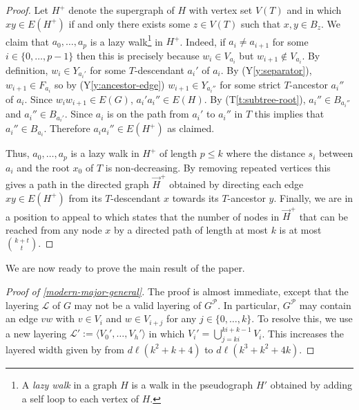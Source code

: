 \documentclass{patmorin}
\newcommand{\tref}[1]{(T\ref{t:#1})}
\newcommand{\yref}[1]{(Y\ref{y:#1})}
\renewcommand{\le}{\leqslant}
\begin{document}
\begin{proof}
  Let $H^+$ denote the supergraph of $H$ with vertex set $V(T)$ and in which $xy\in E(H^+)$ if and only there exists some $z\in V(T)$ such that $x,y\in B_z$. 
  We claim that $a_0,\ldots,a_p$ is a lazy walk\footnote{A \emph{lazy walk} in a graph $H$ is a walk in the pseudograph $H'$ obtained by adding a self loop to each vertex of $H$.} in $H^+$.  Indeed, if $a_i\neq a_{i+1}$ for some $i\in\{0,\ldots,p-1\}$ then this is precisely because $w_i\in V_{a_i}$ but $w_{i+1}\not\in V_{a_i}$.  By definition, $w_i\in Y_{a_i'}$ for some $T$-descendant $a_i'$ of $a_i$.
  By \yref{separator}, $w_{i+1}\in F_{a_i}$ so by \yref{ancestor-edge} $w_{i+1}\in Y_{a_i''}$ for some strict $T$-ancestor $a_i''$ of $a_i$.  Since $w_iw_{i+1}\in E(G)$, $a_i'a_i''\in E(H)$.  By \tref{subtree-root}, $a_i''\in B_{a_i''}$ and $a_i''\in B_{a_i'}$.  Since $a_i$ is on the path from $a_i'$ to $a_i''$ in $T$ this implies that $a_i''\in B_{a_i}$.  Therefore $a_ia_i''\in E(H^+)$ as claimed.
  
  Thus, $a_0,\ldots,a_p$ is a lazy walk in $H^+$ of length $p\le k$ where the distance $s_i$ between $a_i$ and the root $x_0$ of $T$ is non-decreasing.  By removing repeated vertices this gives a path in the directed graph $\overrightarrow{H}^+$ obtained by directing each edge $xy\in E(H^+)$ from its $T$-descendant $x$ towards its $T$-ancestor $y$. 
  Finally, we are in a position to appeal to \cite[Lemma~24]{pilipczuk.siebertz:polynomial-arxiv} which states that the number of nodes in $\overrightarrow{H}^+$ that can be reached from any node $x$ by a directed path of length at most $k$ is at most $\binom{k+t}{t}$.
\end{proof}

We are now ready to prove the main result of the paper. 

\begin{proof}[Proof of \cref{modern-major-general}] 
  The proof is almost immediate, except that the layering $\mathcal{L}$ of $G$ may not be a valid layering of $G^{\mathcal{P}}$.  In particular, $G^{\mathcal{P}}$ may contain an edge $vw$ with $v\in V_i$ and $w\in V_{i+j}$ for any $j\in\{0,\ldots,k\}$.  To resolve this, we use a new layering $\mathcal{L}':=\langle V_0',\ldots,V_h'\rangle$ in which $V_i'=\bigcup_{j=ki}^{ki+k-1} V_i$.  This increases the layered width given by  from $d\ell(k^2+k+4)$ to $d\ell(k^3+k^2+4k)$.
\end{proof}
\end{document}
